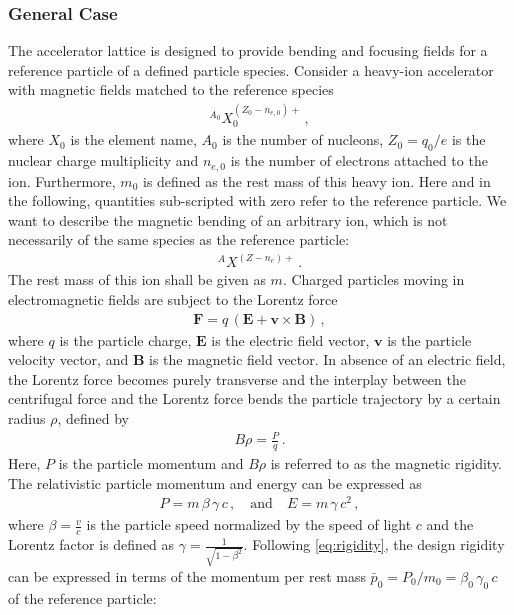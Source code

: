 \subsubsection{General Case}
%
The accelerator lattice is designed to provide bending and focusing fields for a reference particle of a defined particle species. Consider a heavy-ion accelerator with magnetic fields matched to the reference species
\begin{align}
^{A_0}X_0^{(Z_0-n_{e,0})+}  \, ,
\end{align}
where $X_0$ is the element name, $A_0$ is the number of nucleons, $Z_0=q_0/e$ is the nuclear charge multiplicity and $n_{e,0}$ is the number of electrons attached to the ion. Furthermore, $m_0$ is defined as the rest mass of this heavy ion. Here and in the following, quantities sub-scripted with zero refer to the reference particle. We want to describe the magnetic bending of an arbitrary ion, which is not necessarily of the same species as the reference particle:
\begin{align}
^{A}X^{(Z-n_{e})+}\, .
\end{align}
The rest mass of this ion shall be given as $m$. Charged particles moving in electromagnetic fields are subject to the Lorentz force~\cite{griffiths13}
\begin{align}
\mathbf{F} = q \, ( \mathbf{E} + \mathbf{v} \times \mathbf{B} ) \, ,
\end{align} 
where $q$ is the particle charge, $\mathbf{E}$ is the electric field vector, $\mathbf{v}$ is the particle velocity vector, and $\mathbf{B}$ is the magnetic field vector. In absence of an electric field, the Lorentz force becomes purely transverse and the interplay between the centrifugal force and the Lorentz force bends the particle trajectory by a certain radius $\rho$, defined by~\cite{wiedemann1999particle}
\begin{align}
B  \rho = \frac{P}{q} \, . \label{eq:rigidity}
\end{align}  
Here, $P$ is the particle momentum and $B \rho$ is referred to as the magnetic rigidity. The relativistic particle momentum and energy can be expressed as
\begin{align}
P = m \, \beta \, \gamma \, c \, , \quad \text{and} \quad E = m \, \gamma \, c^2 \, ,
\end{align}
where $\beta=\frac{v}{c}$ is the particle speed normalized by the speed of light $c$ and the Lorentz factor is defined as $\gamma = \frac{1}{\sqrt{1-\beta^2}}$. Following \eqref{eq:rigidity}, the design rigidity can be expressed  in terms of the momentum per rest mass $\bar{p}_0=P_0/m_0 = \beta_0 \, \gamma_0 \, c$ of the reference particle:

